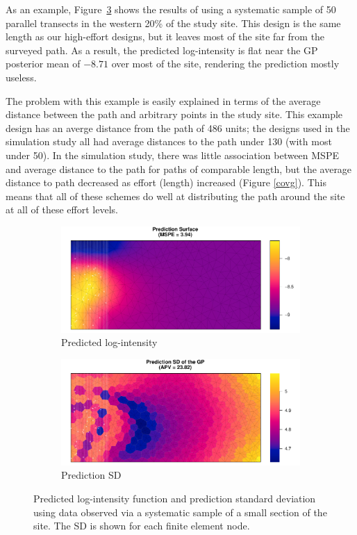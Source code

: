 \documentclass[review]{elsarticle}
\begin{document}
As an example, Figure~\ref{badxsect} shows the results of using a systematic
sample of 50 parallel transects in the western 20\% of the study site. This
design is the same length as our high-effort designs, but it leaves most of the
site far from the surveyed path. As a result, the predicted log-intensity is
flat near the GP posterior mean of \(-8.71\) over most of the site, rendering
the prediction mostly useless.

The problem with this example is easily explained in terms of the average
distance between the path and arbitrary points in the study site. This example
design has an averge distance from the path of 486 units; the designs used in
the simulation study all had average distances to the path under 130 (with most
under 50). In the simulation study, there was little association between
MSPE and average distance to the path for paths of comparable length, but the
average distance to path decreased as effort (length) increased
(Figure \ref{covg}). This means that all of these schemes do well at
distributing the path around the site at all of these effort levels.

\begin{figure}

\begin{subfigure}{5in}
\includegraphics[width=5in]{../graphics/lambda-BadXsect-LGCP000004.pdf}
\caption{Predicted log-intensity}
\label{lambdabad}
\end{subfigure}

\begin{subfigure}{5in}
\includegraphics[width=5in]{../graphics/lambdaSD-BadXsect-LGCP000004.pdf}
\caption{Prediction SD}
\label{sdbad}
\end{subfigure}

\caption{Predicted log-intensity function and prediction standard deviation
using data observed via a systematic sample of a small section of the site. The
SD is shown for each finite element node.}
\label{badxsect}
\end{figure}
\end{document}

